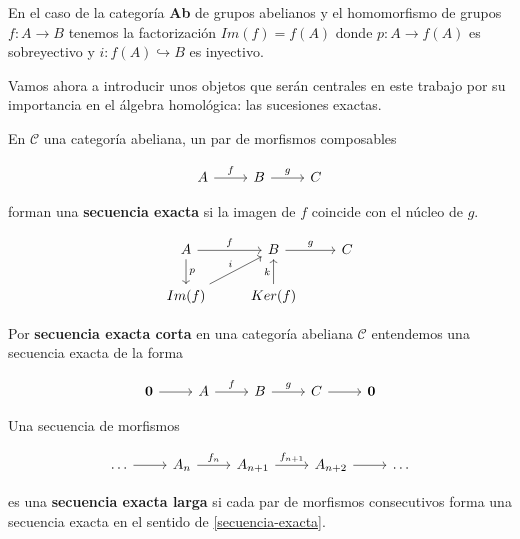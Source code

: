 \begin{ejemplo}
    En el caso de la categoría \textbf{Ab} de grupos abelianos y el homomorfismo de grupos $f: A \longrightarrow B$ tenemos la factorización $Im(f) = f(A)$ donde $p: A \longrightarrow f(A)$ es sobreyectivo y $i: f(A) \hookrightarrow B$ es inyectivo.
\end{ejemplo}

Vamos ahora a introducir unos objetos que serán centrales en este trabajo por su importancia en el álgebra homológica: las sucesiones exactas.

\begin{definicion} \label{secuencia-exacta}
    En $\mathscr{C}$ una categoría abeliana, un par de morfismos composables 

    \begin{equation}
        \begin{tikzcd}
            A \arrow{r}{f} & B \arrow{r}{g} & C
        \end{tikzcd}
    \end{equation}

    forman una \textbf{secuencia exacta}  si la imagen de $f$ coincide con el núcleo de $g$. 

    \begin{equation}
        \begin{tikzcd}
            A \arrow{r}{f} \arrow{d}{p} & B \arrow{r}{g} & C \\
            Im(f) \arrow{ur}{i} & Ker(f) \arrow{u}{k}
        \end{tikzcd}
    \end{equation}
\end{definicion}

\begin{definicion}
    Por \textbf{secuencia exacta corta} en una categoría abeliana $\mathscr{C}$ entendemos una secuencia exacta de la forma 

    \begin{equation}
        \begin{tikzcd}
            \boldsymbol{0} \arrow{r} & A \arrow{r}{f} & B \arrow{r}{g} & C \arrow{r} & \boldsymbol{0}
        \end{tikzcd}
    \end{equation}
\end{definicion}

\begin{definicion}
    Una secuencia de morfismos

    \begin{equation}
        \begin{tikzcd}
            \dots \arrow{r} & A_n \arrow{r}{f_n} & A_{n+1} \arrow{r}{f_{n+1}} & A_{n+2} \arrow{r} & \dots
        \end{tikzcd}
    \end{equation}

    es una \textbf{secuencia exacta larga} si cada par de morfismos consecutivos forma una secuencia exacta en el sentido de \ref{secuencia-exacta}.
\end{definicion}

